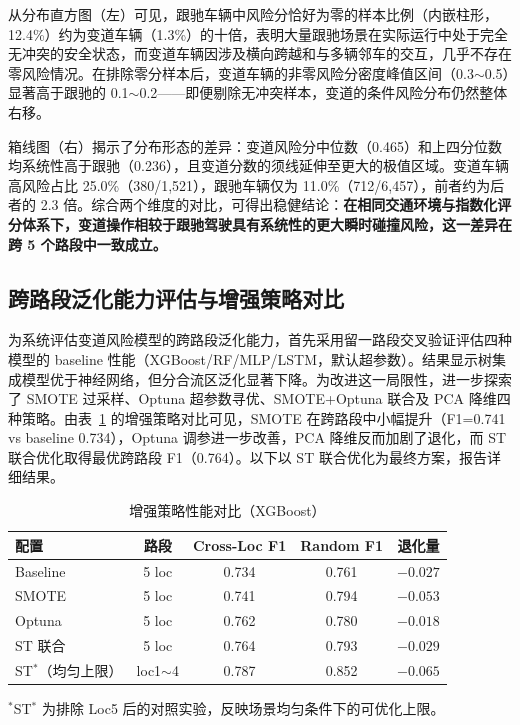\documentclass[preprint,review,12pt,a4paper]{elsarticle}
\begin{document}
从分布直方图（左）可见，跟驰车辆中风险分恰好为零的样本比例（内嵌柱形，12.4\%）约为变道车辆（1.3\%）的十倍，表明大量跟驰场景在实际运行中处于完全无冲突的安全状态，而变道车辆因涉及横向跨越和与多辆邻车的交互，几乎不存在零风险情况。在排除零分样本后，变道车辆的非零风险分密度峰值区间（0.3$\sim$0.5）显著高于跟驰的 0.1$\sim$0.2——即便剔除无冲突样本，变道的条件风险分布仍然整体右移。

箱线图（右）揭示了分布形态的差异：变道风险分中位数（0.465）和上四分位数均系统性高于跟驰（0.236），且变道分数的须线延伸至更大的极值区域。变道车辆高风险占比 25.0\%（380/1,521），跟驰车辆仅为 11.0\%（712/6,457），前者约为后者的 2.3 倍。综合两个维度的对比，可得出稳健结论：\textbf{在相同交通环境与指数化评分体系下，变道操作相较于跟驰驾驶具有系统性的更大瞬时碰撞风险，这一差异在跨 5 个路段中一致成立。}

\subsection{跨路段泛化能力评估与增强策略对比}

为系统评估变道风险模型的跨路段泛化能力，首先采用留一路段交叉验证评估四种模型的 baseline 性能（XGBoost/RF/MLP/LSTM，默认超参数）。结果显示树集成模型优于神经网络，但分合流区泛化显著下降。为改进这一局限性，进一步探索了 SMOTE 过采样、Optuna 超参数寻优、SMOTE+Optuna 联合及 PCA 降维四种策略。由表~\ref{tab:enhance_summary} 的增强策略对比可见，SMOTE 在跨路段中小幅提升（F1=0.741 vs baseline 0.734），Optuna 调参进一步改善，PCA 降维反而加剧了退化，而 ST 联合优化取得最优跨路段 F1（0.764）。以下以 ST 联合优化为最终方案，报告详细结果。

\begin{table}[H]
\centering
\caption{增强策略性能对比（XGBoost）}\label{tab:enhance_summary}\small
\begin{tabular}{lcccc}
\toprule
配置 & 路段 & Cross-Loc F1 & Random F1 & 退化量 \\
\midrule
Baseline & 5 loc & 0.734 & 0.761 & $-0.027$ \\
SMOTE & 5 loc & 0.741 & 0.794 & $-0.053$ \\
Optuna & 5 loc & 0.762 & 0.780 & $-0.018$ \\
ST 联合 & 5 loc & 0.764 & 0.793 & $-0.029$ \\
ST$^*$（均匀上限）& loc1$\sim$4 & 0.787 & 0.852 & $-0.065$ \\
\bottomrule
\end{tabular}
\end{table}
\noindent$^*$ST$^*$ 为排除 Loc5 后的对照实验，反映场景均匀条件下的可优化上限。
\end{document}
